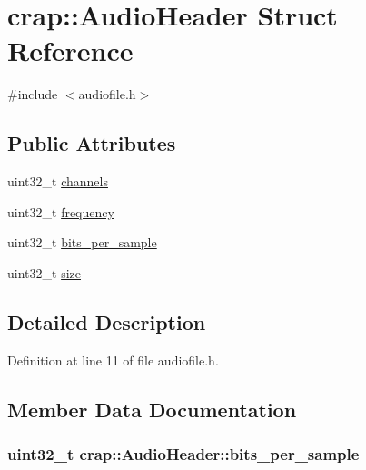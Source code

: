 \hypertarget{structcrap_1_1_audio_header}{\section{crap\+:\+:Audio\+Header Struct Reference}
\label{structcrap_1_1_audio_header}
}


{\ttfamily \#include $<$audiofile.\+h$>$}

\subsection*{Public Attributes}
\begin{DoxyCompactItemize}
\item 
uint32\+\_\+t \hyperlink{structcrap_1_1_audio_header_acce2baa85f0c4f92b05f0c7c5c831835}{channels}
\item 
uint32\+\_\+t \hyperlink{structcrap_1_1_audio_header_a4e84b055b61332538db96e156cc13fe6}{frequency}
\item 
uint32\+\_\+t \hyperlink{structcrap_1_1_audio_header_a73e84cbdf153067986b4826f48e7c6e9}{bits\+\_\+per\+\_\+sample}
\item 
uint32\+\_\+t \hyperlink{structcrap_1_1_audio_header_abb74cac78b291b8f8548566db8aa1112}{size}
\end{DoxyCompactItemize}


\subsection{Detailed Description}


Definition at line 11 of file audiofile.\+h.



\subsection{Member Data Documentation}
\hypertarget{structcrap_1_1_audio_header_a73e84cbdf153067986b4826f48e7c6e9}{
\subsubsection[{bits\+\_\+per\+\_\+sample}]{\setlength{\rightskip}{0pt plus 5cm}uint32\+\_\+t crap\+::\+Audio\+Header\+::bits\+\_\+per\+\_\+sample}}\label{structcrap_1_1_audio_header_a73e84cbdf153067986b4826f48e7c6e9}


